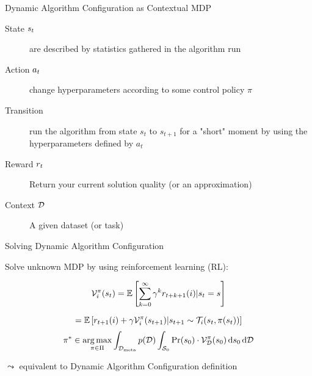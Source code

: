 \begin{frame}[c]{Dynamic Algorithm Configuration as Contextual MDP }


\begin{description}
	\item[State $s_t$] are described by statistics gathered in the algorithm run
	\pause
	\item[Action $a_t$] change hyperparameters according to some control policy $\pi$
	\pause
	\item[Transition] run the algorithm from state $s_t$ to $s_{t+1}$ for a "short" moment by using the hyperparameters defined by $a_t$
	\pause
	\item[Reward $r_t$] Return your current solution quality (or an approximation)
	\pause
	\item[Context $\mathcal{D}$] A given dataset (or task)
\end{description}

\bigskip
	
\centering

	
	
\end{frame}
\begin{frame}[c]{Solving Dynamic Algorithm Configuration}

Solve unknown MDP by using reinforcement learning (RL):

\begin{equation}
\mathcal{V}_i^\pi(s_t) =  \mathbb{E} \left[\sum_{k=0}^\infty\gamma^k r_{t+k+1}(i)| s_t=s \right]\nonumber
\end{equation}
\pause

\begin{equation}
 = \mathbb{E} \left[ r_{t+1}(i)+\gamma\mathcal{V}_i^\pi(s_{t+1})| s_{t+1} \sim \mathcal{T}_i(s_t, \pi(s_t)) \right] \nonumber
\end{equation}
\pause
\begin{equation}
\pi^* \in
\operatorname*{arg\,max}_{\pi \in \Pi}
\int_{\mathcal{D}_{\text{meta}}} p(\mathcal{D}) \int_{\mathcal{S}_0} \Pr(s_0) \cdot \mathcal{V}^\pi_{\mathcal{D}}(s_0) \mathop{}\!\mathrm{d} s_0 \mathop{}\!\mathrm{d} \mathcal{D} \nonumber
\end{equation}

\bigskip
\pause
$\leadsto$ equivalent to Dynamic Algorithm Configuration definition


\end{frame}
